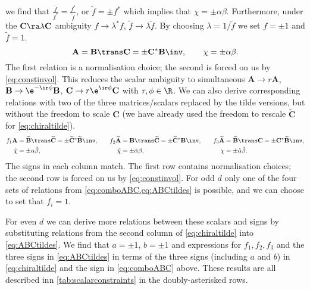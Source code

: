 \documentclass[11pt]{article}
\newcommand{\cc}{^\ast}
\newcommand{\A}{\mathbf{A}}
\newcommand{\B}{\mathbf{B}}
\renewcommand{\C}{\mathbf{C}}
\newcommand{\At}{\widetilde{\A}}
\newcommand{\Bt}{\widetilde{\B}}
\newcommand{\Ct}{\widetilde{\C}}
\newcommand{\alphat}{\tilde{\alpha}}
\newcommand{\betat}{\tilde{\beta}}
\newcommand{\chit}{\tilde{\chi}}
\begin{document}
we find that \( \frac{\tilde{f}}{f\cc} = \frac{f\cc}{\tilde{f}} \),
or \( \tilde{f} = \pm f\cc \) which implies that \(\chi = \pm \alpha \beta\).
Furthermore, under the \(\C \ra \lambda \C\) ambiguity \( f \rightarrow \lambda\cc f\),
\(\tilde{f} \rightarrow \lambda \tilde{f} \).
By choosing \(\lambda = 1/\tilde{f}\) we set \(f = \pm1\) and \(\tilde{f} = 1\).
%
\begin{equation}\label{eq:comboABC}
  \A = \B\trans \C = \pm \C\cc \B\inv, \qquad
  \chi = \pm \alpha \beta.
\end{equation}
%
The first relation is a normalisation choice; the second is forced on us by \cref{eq:constinvol}.
This reduces the scalar ambiguity to simultaneous \( \A \rightarrow r \A \),
\( \B \rightarrow \e^{-\ir\phi} \B \), \( \C \rightarrow r\e^{\ir\phi} \C \)
with \( r, \phi \in \R \).
We can also derive corresponding relations with two of the three matrices/scalars replaced by the tilde versions, but without the freedom to scale \(\C\) (we have already used the freedom to rescale \(\Ct\) for \cref{eq:chiraltilde}).
%
\begin{equation}\label{eq:ABCtildes}
\begin{aligned}
  f_1 \A &= \Bt\trans \Ct = \pm \Ct\cc \Bt\inv, &\quad
  f_2 \At &= \B\trans \Ct = \pm \Ct\cc \B\inv, &\quad
  f_3 \At &= \Bt\trans \C = \pm \C\cc \Bt\inv, \\
  {\chit} &= \pm {\alpha} {\betat}, &
  {\chit} &= \pm {\alphat} {\beta}, &
  {\chi} &= \pm {\alphat} {\betat}.
\end{aligned}
\end{equation}
%
The signs in each column match.
The first row contains normalisation choices; 
the second row is forced on us by \cref{eq:constinvol}.
For odd \(d\) only one of the four sets of relations from \cref{eq:comboABC,eq:ABCtildes} is possible, and we can choose to set that \(f_i = 1\).

For even \(d\) we can derive more relations between these scalars and signs by substituting relations from the second column of \cref{eq:chiraltilde} into \cref{eq:ABCtildes}.
We find that \(a = \pm 1\), \(b = \pm 1\) and expressions for \(f_1,f_2,f_3\) and the three signs in \cref{eq:ABCtildes} in terms of the three signs (including \(a\) and \(b\)) in \cref{eq:chiraltilde} and the sign in \cref{eq:comboABC} above.
These results are all described inn \cref{tab:scalarconstraints} in the doubly-asterisked rows.
\end{document}
